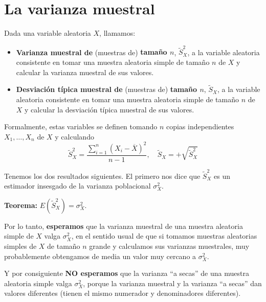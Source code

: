\documentclass[
  spanish,
  letterpaper,
  DIV=11,
  numbers=noendperiod]{scrreprt}
\begin{document}
\section{La varianza muestral}\label{la-varianza-muestral}

Dada una variable aleatoria \(X\), llamamos:

\begin{itemize}
\item
  \textbf{Varianza muestral de} (muestras de) \textbf{tamaño \(n\)},
  \(\widetilde{S}_{X}^2\), a la variable aleatoria consistente en tomar
  una muestra aleatoria simple de tamaño \(n\) de \(X\) y calcular la
  varianza muestral de sus valores.
\item
  \textbf{Desviación típica muestral de} (muestras de) \textbf{tamaño
  \(n\)}, \(\widetilde{S}_{X}\), a la variable aleatoria consistente en
  tomar una muestra aleatoria simple de tamaño \(n\) de \(X\) y calcular
  la desviación típica muestral de sus valores.
\end{itemize}

Formalmente, estas variables se definen tomando \(n\) copias
independientes \(X_1,\ldots,X_n\) de \(X\) y calculando \[
\widetilde{S}_{X}^2=\frac{\sum_{i=1}^n (X_{i}-\overline{X})^2}{n-1},\quad 
\widetilde{S}_{X}=+\sqrt{\widetilde{S}_{X}^2}
\]

Tenemos los dos resultados siguientes. El primero nos dice que
\(\widetilde{S}_{X}^2\) es un estimador insesgado de la varianza
poblacional \(\sigma_{X}^2\).

\textbf{Teorema:} \(E(\widetilde{S}_{X}^2)=\sigma_{X}^2\).

Por lo tanto, \textbf{esperamos} que la varianza muestral de una muestra
aleatoria simple de \(X\) valga \(\sigma_{X}^2\), en el sentido usual de
que si tomamos muestras aleatorias simples de \(X\) de tamaño \(n\)
grande y calculamos sus varianzas muestrales, muy probablemente
obtengamos de media un valor muy cercano a \(\sigma_{X}^2\).

\begin{tcolorbox}[enhanced jigsaw, arc=.35mm, bottomrule=.15mm, bottomtitle=1mm, breakable, colback=white, colbacktitle=quarto-callout-warning-color!10!white, colframe=quarto-callout-warning-color-frame, coltitle=black, left=2mm, leftrule=.75mm, opacityback=0, opacitybacktitle=0.6, rightrule=.15mm, title=\textcolor{quarto-callout-warning-color}{\faExclamationTriangle}\hspace{0.5em}{Advertencia}, titlerule=0mm, toprule=.15mm, toptitle=1mm]

Y por consiguiente \textbf{NO esperamos} que la varianza ``a secas'' de
una muestra aleatoria simple valga \(\sigma_{X}^2\), porque la varianza
muestral y la varianza ``a secas'' dan valores diferentes (tienen el
mismo numerador y denominadores diferentes).

\end{tcolorbox}
\end{document}
